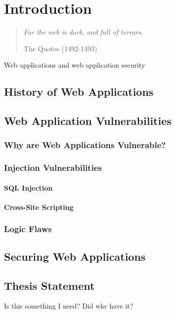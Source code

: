 %
%

\chapter{Introduction}


\begin{quote}

{\em For the web is dark, and full of terrors.}

 The Quotee (1492-1493)

\end{quote}


Web applications and web application security


\section{History of Web Applications}

\section{Web Application Vulnerabilities}

\subsection{Why are Web Applications Vulnerable?}

\subsection{Injection Vulnerabilities}

\subsubsection{SQL Injection}

\subsubsection{Cross-Site Scripting}

\subsection{Logic Flaws}



\section{Securing Web Applications}

\section{}



\pagebreak
\section*{Thesis Statement}

Is this something I need? Did wkr have it?


